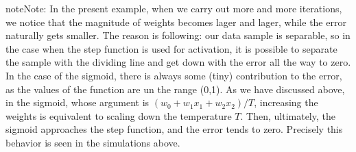 \documentclass[letterpaper,10pt,english]{jupyterBook}
\begin{document}
\begin{sphinxVerbatim}[commandchars=\\\{\}]
 
 
 

   

\end{sphinxVerbatim}

\noindent{}

\begin{sphinxadmonition}{note}{Note:}
\sphinxAtStartPar
In the present example, when we carry out more and more iterations, we notice that the magnitude of weights becomes lager and lager, while the error naturally gets smaller. The reason is following: our data sample is separable, so in the case when the step function is used for activation, it is possible to separate the sample with the dividing line and get down with the error all the way to zero. In the case of the sigmoid, there is always some (tiny) contribution to the error, as the values of the function are un the range (0,1). As we have discussed above, in the sigmoid, whose argument is \( (w_0 + w_1 x_1 + w_2 x_2) / T\), increasing the weights is equivalent to scaling down the temperature \(T\). Then, ultimately, the sigmoid approaches the step function, and the error tends to zero. Precisely this behavior is seen in the simulations above.
\end{sphinxadmonition}
\end{document}
